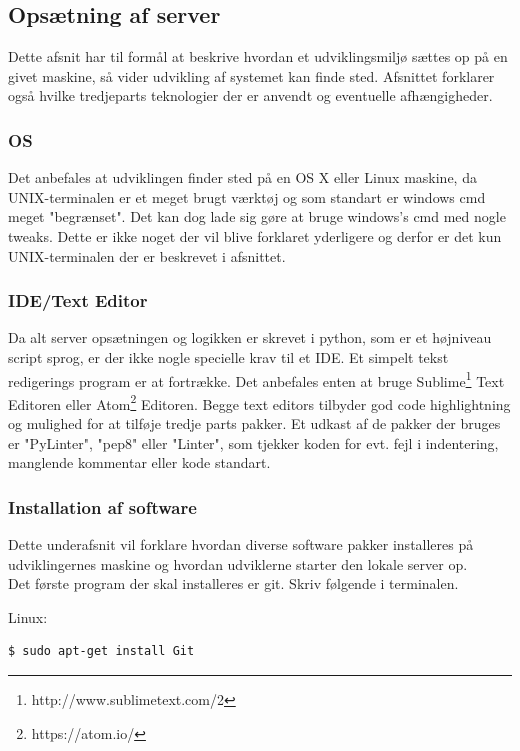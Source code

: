 \subsection{Opsætning af server}
Dette afsnit har til formål at beskrive hvordan et udviklingsmiljø sættes op på en givet maskine, så vider udvikling af systemet kan finde sted. Afsnittet forklarer også hvilke tredjeparts teknologier der er anvendt og eventuelle afhængigheder.

\subsubsection*{OS}
Det anbefales at udviklingen finder sted på en OS X eller Linux maskine, da UNIX-terminalen er et meget brugt værktøj og som standart er windows cmd meget "begrænset". Det kan dog lade sig gøre at bruge windows's cmd med nogle tweaks. Dette er ikke noget der vil blive forklaret yderligere og derfor er det kun UNIX-terminalen der er beskrevet i afsnittet.

\subsubsection*{IDE/Text Editor}
Da alt server opsætningen og logikken er skrevet i python, som er et højniveau script sprog, er der ikke nogle specielle krav til et IDE. Et simpelt tekst redigerings program er at fortrække. Det anbefales enten at bruge Sublime\footnote{http://www.sublimetext.com/2} Text Editoren eller Atom\footnote{https://atom.io/} Editoren. Begge text editors tilbyder god code highlightning og mulighed for at tilføje tredje parts pakker. Et udkast af de pakker der bruges er "PyLinter", "pep8" eller "Linter", som tjekker koden for evt. fejl i indentering, manglende kommentar eller kode standart.

\subsubsection*{Installation af software}
Dette underafsnit vil forklare hvordan diverse software pakker installeres på udviklingernes maskine og hvordan udviklerne starter den lokale server op. \\
Det første program der skal installeres er git. Skriv følgende i terminalen.

Linux:
\begin{lstlisting}[language=bash]
	$ sudo apt-get install Git
\end{lstlisting}

